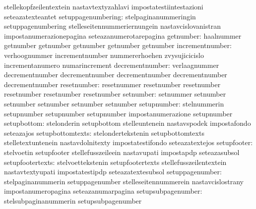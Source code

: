                                   stellekopfzeilentextein          nastavtextyzahlavi
                                  impostatestiintestazioni         seteazatexteantet
              setuppagenumbering: stelpaginanummeringin            setuppagenumbering
                                  stelleseitennummeriernungein     nastavcislovanistran
                                  impostanumerazionepagina         seteazanumerotarepagina
      getnumber: haalnummer          getnumber
                 getnumber           getnumber
                 getnumber           getnumber
incrementnumber: verhoognummer       incrementnumber
                 nummererhoehen      zvysujicicislo
                 incrementanumero    numarincrement
decrementnumber: verlaagnummer       decrementnumber
                 decrementnumber     decrementnumber
                 decrementnumber     decrementnumber
    resetnumber: resetnummer         resetnumber
                 resetnumber         resetnumber
                 resetnumber         resetnumber
      setnumber: setnummer           setnumber
                 setnumber           setnumber
                 setnumber           setnumber
    setupnumber: stelnummerin        setupnumber
                 setupnumber         setupnumber
                 impostanumerazione  setupnumber
                     setupbottom: stelonderin                      setupbottom
                                  stelleuntenein                   nastavspodek
                                  impostafondo                     seteazajos
                setupbottomtexts: stelondertekstenin               setupbottomtexts
                                  stelletextuntenein               nastavdolnitexty
                                  impostatestifondo                seteazatextejos
                     setupfooter: stelvoetin                       setupfooter
                                  stellefusszeileein               nastavupati
                                  impostapdp                       seteazasubsol
                setupfootertexts: stelvoettekstenin                setupfootertexts
                                  stellefusszeilentextein          nastavtextyupati
                                  impostatestipdp                  seteazatextesubsol
                 setuppagenumber: stelpaginanummerin               setuppagenumber
                                  stelleseitennummerein            nastavcislostrany
                                  impostanumeropagina              seteazanumarpagina
              setupsubpagenumber: stelsubpaginanummerin            setupsubpagenumber
